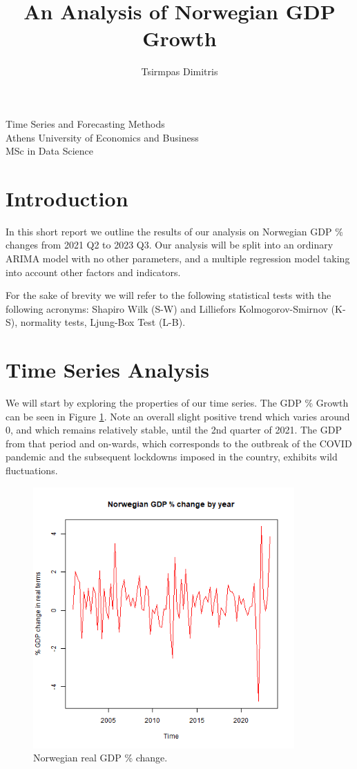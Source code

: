 \documentclass[11pt, a4paper]{article}
\title{\Huge An Analysis of Norwegian GDP Growth }
\author{\LARGE Tsirmpas Dimitris }
\begin{document}
	\maketitle
	\begin{center}
		\LARGE Time Series and Forecasting Methods \\
		\large Athens University of Economics and Business \\
		\large MSc in Data Science
		
	\end{center}
		

	\section{Introduction}
	In this short report we outline the results of our analysis on Norwegian GDP \% changes from 2021 Q2 to 2023 Q3. Our analysis will be split into an ordinary ARIMA model with no other parameters, and a multiple regression model taking into account other factors and indicators. 
	
	For the sake of brevity we will refer to the following statistical tests with the following acronyms: Shapiro Wilk (S-W) and Lilliefors Kolmogorov-Smirnov (K-S), normality tests, Ljung-Box Test (L-B).
	
	
	\section{Time Series Analysis}
	We will start by exploring the properties of our time series. The GDP  \% Growth can be seen in Figure \ref{fig::gdp}. Note an overall slight positive trend which varies around $0$, and which remains relatively stable, until the 2nd quarter of 2021. The GDP from that period and on-wards, which corresponds to the outbreak of the COVID pandemic and the subsequent lockdowns imposed in the country,  exhibits wild fluctuations.
	
	\begin{figure}
		\includegraphics[width=10cm]{gdp.png}
		\centering
		\caption{Norwegian real GDP \% change.}
		\label{fig::gdp}
	\end{figure}
	
\end{document}
